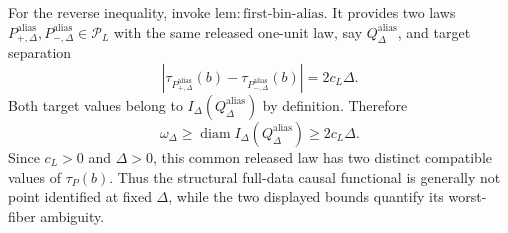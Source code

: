 For the reverse inequality, invoke \(\mathrm{lem:first\text{-}bin\text{-}alias}\).  It provides two laws \(P^{\mathrm{alias}}_{+,\Delta},P^{\mathrm{alias}}_{-,\Delta}\in\mathcal P_L\) with the same released one-unit law, say \(Q_\Delta^{\mathrm{alias}}\), and target separation
\[
 \left|\tau_{P^{\mathrm{alias}}_{+,\Delta}}(b)
       -\tau_{P^{\mathrm{alias}}_{-,\Delta}}(b)\right|
 =2c_L\Delta.
\]
Both target values belong to \(I_\Delta(Q_\Delta^{\mathrm{alias}})\) by definition.  Therefore
\[
 \omega_\Delta
 \geq\operatorname{diam}I_\Delta(Q_\Delta^{\mathrm{alias}})
 \geq2c_L\Delta.
\]
Since \(c_L>0\) and \(\Delta>0\), this common released law has two distinct compatible values of \(\tau_P(b)\).  Thus the structural full-data causal functional is generally not point identified at fixed \(\Delta\), while the two displayed bounds quantify its worst-fiber ambiguity.